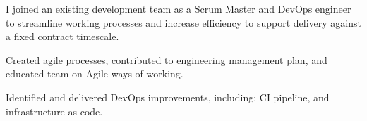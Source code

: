 
I joined an existing development team as a Scrum Master and DevOps engineer to streamline working processes and increase efficiency to support delivery against a fixed contract timescale.

\vspace{0.25em}
\begin{tightemize}
  \item Created agile processes, contributed to engineering management plan, and educated team on Agile ways-of-working.
  \item Identified and delivered DevOps improvements, including: CI pipeline, and infrastructure as code.
\end{tightemize}
\sectionsep{}
\vfill{}